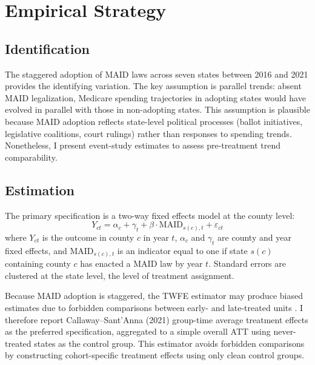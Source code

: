 \documentclass[12pt]{article}
\begin{document}



\section{Empirical Strategy}
\label{sec:strategy}

\subsection{Identification}

The staggered adoption of MAID laws across seven states between 2016 and 2021 provides the identifying variation. The key assumption is parallel trends: absent MAID legalization, Medicare spending trajectories in adopting states would have evolved in parallel with those in non-adopting states. This assumption is plausible because MAID adoption reflects state-level political processes (ballot initiatives, legislative coalitions, court rulings) rather than responses to spending trends. Nonetheless, I present event-study estimates to assess pre-treatment trend comparability.

\subsection{Estimation}

The primary specification is a two-way fixed effects model at the county level:
\begin{equation}
Y_{ct} = \alpha_c + \gamma_t + \beta \cdot \text{MAID}_{s(c),t} + \varepsilon_{ct}
\label{eq:twfe}
\end{equation}
where $Y_{ct}$ is the outcome in county $c$ in year $t$, $\alpha_c$ and $\gamma_t$ are county and year fixed effects, and $\text{MAID}_{s(c),t}$ is an indicator equal to one if state $s(c)$ containing county $c$ has enacted a MAID law by year $t$. Standard errors are clustered at the state level, the level of treatment assignment.

Because MAID adoption is staggered, the TWFE estimator may produce biased estimates due to forbidden comparisons between early- and late-treated units \citep{goodman2021, dechaisemartin2020}. I therefore report Callaway--Sant'Anna (2021) group-time average treatment effects as the preferred specification, aggregated to a simple overall ATT using never-treated states as the control group. This estimator avoids forbidden comparisons by constructing cohort-specific treatment effects using only clean control groups.
\end{document}
